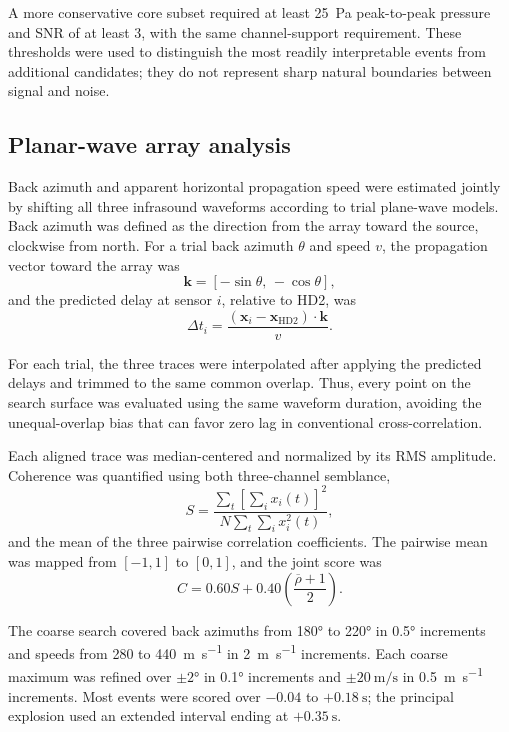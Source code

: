 \documentclass[12pt]{article}
\begin{document}
A more conservative core subset required at least \SI{25}{\pascal} peak-to-peak
pressure and SNR of at least 3, with the same channel-support requirement. These
thresholds were used to distinguish the most readily interpretable events from
additional candidates; they do not represent sharp natural boundaries between
signal and noise.

\subsection{Planar-wave array analysis}

Back azimuth and apparent horizontal propagation speed were estimated jointly
by shifting all three infrasound waveforms according to trial plane-wave models.
Back azimuth was defined as the direction from the array toward the source,
clockwise from north. For a trial back azimuth $\theta$ and speed $v$, the
propagation vector toward the array was
\begin{equation}
  \mathbf{k} = [-\sin\theta,\,-\cos\theta],
  \label{eq:propagation-vector}
\end{equation}
and the predicted delay at sensor $i$, relative to HD2, was
\begin{equation}
  \Delta t_i =
  \frac{(\mathbf{x}_i-\mathbf{x}_{\mathrm{HD2}})\cdot\mathbf{k}}{v}.
  \label{eq:planar-delay}
\end{equation}

For each trial, the three traces were interpolated after applying the predicted
delays and trimmed to the same common overlap. Thus, every point on the search
surface was evaluated using the same waveform duration, avoiding the
unequal-overlap bias that can favor zero lag in conventional cross-correlation.

Each aligned trace was median-centered and normalized by its RMS amplitude.
Coherence was quantified using both three-channel semblance,
\begin{equation}
  S =
  \frac{\sum_t\left[\sum_i x_i(t)\right]^2}
  {N\sum_t\sum_i x_i^2(t)},
  \label{eq:semblance}
\end{equation}
and the mean of the three pairwise correlation coefficients. The pairwise mean
was mapped from $[-1,1]$ to $[0,1]$, and the joint score was
\begin{equation}
  C = 0.60S + 0.40\left(\frac{\overline{\rho}+1}{2}\right).
  \label{eq:joint-coherence}
\end{equation}

The coarse search covered back azimuths from \ang{180} to \ang{220} in
\ang{0.5} increments and speeds from 280 to \SI{440}{\metre\per\second} in
\SI{2}{\metre\per\second} increments. Each coarse maximum was refined over
$\pm\ang{2}$ in \ang{0.1} increments and
$\pm\SI{20}{\metre\per\second}$ in \SI{0.5}{\metre\per\second} increments.
Most events were scored over $-0.04$ to $+\SI{0.18}{\second}$; the principal
explosion used an extended interval ending at $+\SI{0.35}{\second}$.
\end{document}
